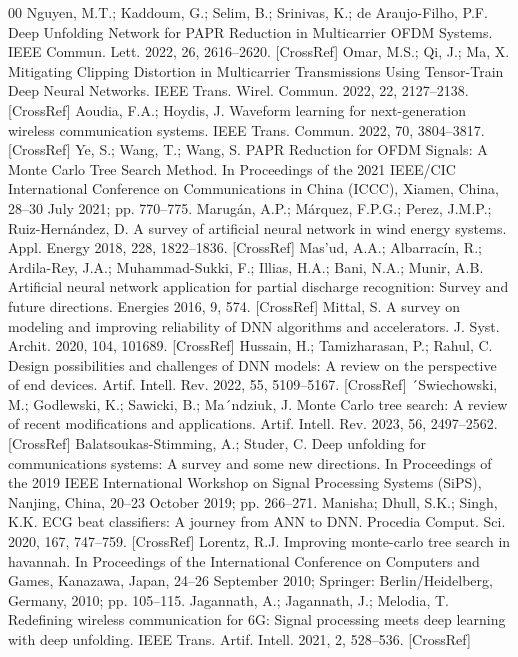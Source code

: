 \documentclass[conference]{IEEEtran}
\begin{document}
\begin{thebibliography}{00}
 Nguyen, M.T.; Kaddoum, G.; Selim, B.; Srinivas, K.; de Araujo-Filho, P.F. Deep Unfolding Network for PAPR Reduction in Multicarrier OFDM Systems. IEEE Commun. Lett. 2022, 26, 2616–2620. [CrossRef]
 Omar, M.S.; Qi, J.; Ma, X. Mitigating Clipping Distortion in Multicarrier Transmissions Using Tensor-Train Deep Neural Networks. IEEE Trans. Wirel. Commun. 2022, 22, 2127–2138. [CrossRef]
 Aoudia, F.A.; Hoydis, J. Waveform learning for next-generation wireless communication systems. IEEE Trans. Commun. 2022, 70, 3804–3817. [CrossRef]
 Ye, S.; Wang, T.; Wang, S. PAPR Reduction for OFDM Signals: A Monte Carlo Tree Search Method. In Proceedings of the 2021 IEEE/CIC International Conference on Communications in China (ICCC), Xiamen, China, 28–30 July 2021; pp. 770–775.
 Marugán, A.P.; Márquez, F.P.G.; Perez, J.M.P.; Ruiz-Hernández, D. A survey of artificial neural network in wind energy systems. Appl. Energy 2018, 228, 1822–1836. [CrossRef]
 Mas’ud, A.A.; Albarracín, R.; Ardila-Rey, J.A.; Muhammad-Sukki, F.; Illias, H.A.; Bani, N.A.; Munir, A.B. Artificial neural network application for partial discharge recognition: Survey and future directions. Energies 2016, 9, 574. [CrossRef]
 Mittal, S. A survey on modeling and improving reliability of DNN algorithms and accelerators. J. Syst. Archit. 2020, 104, 101689. [CrossRef]
 Hussain, H.; Tamizharasan, P.; Rahul, C. Design possibilities and challenges of DNN models: A review on the perspective of end devices. Artif. Intell. Rev. 2022, 55, 5109–5167. [CrossRef]
 ´Swiechowski, M.; Godlewski, K.; Sawicki, B.; Ma´ndziuk, J. Monte Carlo tree search: A review of recent modifications and applications. Artif. Intell. Rev. 2023, 56, 2497–2562. [CrossRef]
 Balatsoukas-Stimming, A.; Studer, C. Deep unfolding for communications systems: A survey and some new directions. In Proceedings of the 2019 IEEE International Workshop on Signal Processing Systems (SiPS), Nanjing, China, 20–23 October 2019; pp. 266–271.
 Manisha; Dhull, S.K.; Singh, K.K. ECG beat classifiers: A journey from ANN to DNN. Procedia Comput. Sci. 2020, 167, 747–759. [CrossRef]
 Lorentz, R.J. Improving monte-carlo tree search in havannah. In Proceedings of the International Conference on Computers and Games, Kanazawa, Japan, 24–26 September 2010; Springer: Berlin/Heidelberg, Germany, 2010; pp. 105–115.
 Jagannath, A.; Jagannath, J.; Melodia, T. Redefining wireless communication for 6G: Signal processing meets deep learning with deep unfolding. IEEE Trans. Artif. Intell. 2021, 2, 528–536. [CrossRef]

\end{thebibliography}
\end{document}

